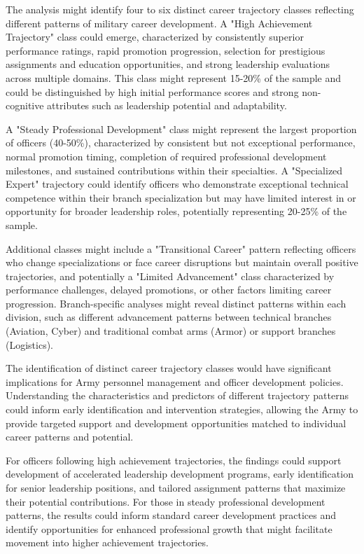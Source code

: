 \documentclass[main.tex]{subfiles}
\begin{document}

The analysis might identify four to six distinct career trajectory classes reflecting different patterns of military career development. A "High Achievement Trajectory" class could emerge, characterized by consistently superior performance ratings, rapid promotion progression, selection for prestigious assignments and education opportunities, and strong leadership evaluations across multiple domains. This class might represent 15-20\% of the sample and could be distinguished by high initial performance scores and strong non-cognitive attributes such as leadership potential and adaptability.

A "Steady Professional Development" class might represent the largest proportion of officers (40-50\%), characterized by consistent but not exceptional performance, normal promotion timing, completion of required professional development milestones, and sustained contributions within their specialties. A "Specialized Expert" trajectory could identify officers who demonstrate exceptional technical competence within their branch specialization but may have limited interest in or opportunity for broader leadership roles, potentially representing 20-25\% of the sample.

Additional classes might include a "Transitional Career" pattern reflecting officers who change specializations or face career disruptions but maintain overall positive trajectories, and potentially a "Limited Advancement" class characterized by performance challenges, delayed promotions, or other factors limiting career progression. Branch-specific analyses might reveal distinct patterns within each division, such as different advancement patterns between technical branches (Aviation, Cyber) and traditional combat arms (Armor) or support branches (Logistics).


The identification of distinct career trajectory classes would have significant implications for Army personnel management and officer development policies. Understanding the characteristics and predictors of different trajectory patterns could inform early identification and intervention strategies, allowing the Army to provide targeted support and development opportunities matched to individual career patterns and potential.

For officers following high achievement trajectories, the findings could support development of accelerated leadership development programs, early identification for senior leadership positions, and tailored assignment patterns that maximize their potential contributions. For those in steady professional development patterns, the results could inform standard career development practices and identify opportunities for enhanced professional growth that might facilitate movement into higher achievement trajectories.
\end{document}
